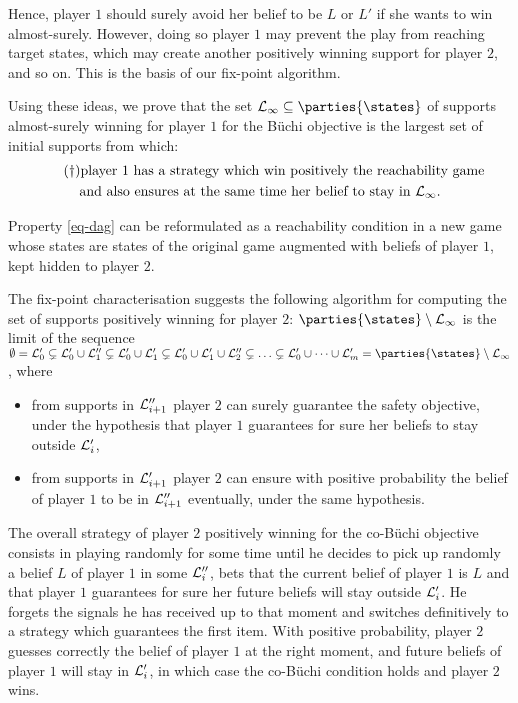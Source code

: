 Hence, player $1$ should surely avoid her belief to be $L$
or $L'$ if she wants to win almost-surely.
However, doing so player $1$ may prevent the play from
reaching target states, which may create another positively winning
support for player $2$, and so on. This is the basis of our fix-point algorithm.

Using these ideas, we prove that the set
$\LL_\infty\subseteq \parties{\states}$ of supports almost-surely
winning for player $1$ for the B{\"u}chi objective is the largest set of
initial supports from which:
\begin{multline}
\label{eq-dag}
\tag{$\dag$}
\textrm{player $1$ has a strategy
  which win positively the reachability game}\\
\textrm{and also ensures at the same time
  her belief to stay in } \mathcal{L}_\infty .
\end{multline}

Property \eqref{eq-dag} can be reformulated as a reachability
condition in a new game whose states are states of the original game
augmented with beliefs of player $1$, kept hidden to player $2$.

The fix-point characterisation suggests the following algorithm for
computing the set of supports positively winning for player $2$:
$\parties{\states}\bh\LL_\infty$ is the limit of the sequence
$\emptyset=\LL_0'\subsetneq \LL_0'\cup \LL_1''\subsetneq\LL_0'\cup
\LL_1'\subsetneq \LL_0'\cup \LL_1'\cup \LL_2''\subsetneq\ldots
\subsetneq \LL_0'\cup \cdots \cup \LL'_m
=\parties{\states}\bh\LL_\infty$, where
\begin{itemize}
\item from supports in $\mathcal{L}''_{i+1}$ player $2$ can surely guarantee the safety objective,
under the hypothesis that player $1$ 
{guarantees for sure} her beliefs to stay outside $\mathcal{L}'_i$,
\item from supports in $\mathcal{L}'_{i+1}$ player $2$ can ensure with positive probability the belief of player $1$ to be in $\mathcal{L}''_{i+1}$ eventually,
under the same hypothesis.
\end{itemize}

The overall strategy of player $2$ positively winning for the co-B{\"u}chi objective
consists in playing randomly for some time until he decides to pick
up randomly a belief $L$ of player $1$ in some $\mathcal{L}''_i$,
bets that the current belief of player $1$ is $L$ and that player $1$
guarantees for sure
her future beliefs 
will stay outside $\mathcal{L}'_i$.
He forgets
the signals he has received up to that moment and switches
definitively to a strategy which guarantees the first item.  With positive
probability, player $2$ %
guesses correctly the belief of player $1$ at the right moment, and
future beliefs of player $1$ will stay in $\mathcal{L}'_i$, in which case the
co-B{\"u}chi condition holds and player $2$ wins.


